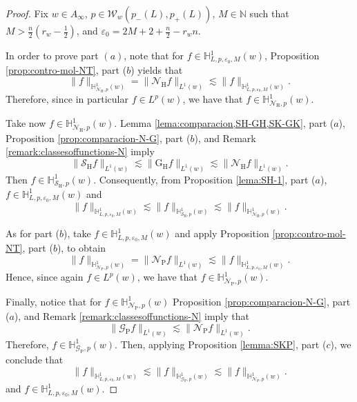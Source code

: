 \documentclass[11pt, a4paper,leqno]{amsart}
\theoremstyle{plain}
\theoremstyle{definition}
\theoremstyle{remark}
\numberwithin{equation}{section}
\def \N{ \mathbb{N} }
\def \Scal{ \mathcal{S} }
\def \hh{ \mathrm{H} }
\def \pp{ \mathrm{P} }
\def \Gcal { \mathcal{G} }
\def \Grm{ \mathrm{G} }
\def \Ncal { \mathcal{N} }
\begin{document}
\begin{proof}
Fix $w\in A_{\infty}$, $p\in \mathcal{W}_w(p_-(L),p_+(L))$, $M\in \N$ such that $M>\frac{n}{2}\left(r_w-\frac{1}{2}\right)$, and $\varepsilon_0=2M+2+\frac{n}{2}-r_wn$. 



In order to prove part $(a)$, note that 
for $f\in \mathbb{H}^1_{L,p,\varepsilon_0, M}(w)$, Proposition \ref{prop:contro-mol-NT}, part ($b$) yields that
$$
\|f\|_{\mathbb{H}^1_{\Ncal_{\hh},p}(w)}=\|\Ncal_{\hh}f\|_{L^1(w)}\lesssim\|f\|_{\mathbb{H}^1_{L,p,\varepsilon_0, M}(w)}.
$$ 
Therefore, since in particular $f\in L^p(w)$, we have that $f\in \mathbb{H}^1_{\Ncal_{\hh},p}(w)$.

\medskip

Take now  $f\in \mathbb{H}^1_{\Ncal_{\hh},p}(w)$. Lemma \ref{lema:comparacion,SH-GH,SK-GK}, part ($a$), Proposition \ref{prop:comparacion-N-G}, part ($b$), and Remark \ref{remark:classesoffunctions-N} imply
$$
\|\Scal_{\hh}f\|_{L^1(w)}\lesssim\|\Grm_{\hh}f\|_{L^1(w)}\lesssim \|\Ncal_{\hh}f\|_{L^1(w)}.
$$ 
Then $f\in \mathbb{H}^1_{\Scal_{\hh},p}(w)$. Consequently, from Proposition \ref{lema:SH-1}, part ($a$), $f\in \mathbb{H}^1_{L,p,\varepsilon_0,M}(w)$ and 
$$
\|f\|_{\mathbb{H}^1_{L,p,\varepsilon_0, M}(w)}\lesssim \|f\|_{\mathbb{H}^1_{\Scal_{\hh},p}(w)}\lesssim \|f\|_{\mathbb{H}^1_{\Ncal_{\hh},p}(w)}.
$$

\medskip 

As for part ($b$), take $f\in \mathbb{H}^1_{L,p,\varepsilon_0,M}(w)$ and apply Proposition \ref{prop:contro-mol-NT}, part ($b$), to obtain
$$
\|f\|_{\mathbb{H}^1_{\Ncal_{\pp},p}(w)}=\|\Ncal_{\pp}f\|_{L^1(w)}\lesssim\|f\|_{\mathbb{H}^1_{L,p,\varepsilon_0,M}(w)}.
$$
Hence, since again $f\in L^p(w)$, we have that
$f\in \mathbb{H}_{\Ncal_{\pp},p}^1(w).$

Finally, notice that for $f\in \mathbb{H}^1_{\Ncal_{\pp},p}(w)$  Proposition \ref{prop:comparacion-N-G}, part ($a$), and Remark \ref{remark:classesoffunctions-N} imply that 
$$
\|\Gcal_{\pp}f\|_{L^1(w)}\lesssim\|\Ncal_{\pp}f\|_{L^1(w)}.
$$
Therefore,  $f\in \mathbb{H}^1_{\Gcal_{\pp},p}(w)$.
Then, applying Proposition \ref{lemma:SKP}, part ($c$), we conclude that
$$
\|f\|_{\mathbb{H}^1_{L,p,\varepsilon_0, M}(w)}\lesssim \|f\|_{\mathbb{H}^1_{\Gcal_{\pp},p}(w)}\lesssim\|f\|_{\mathbb{H}^1_{\Ncal_{\pp},p}(w)}.
$$
and  $f\in \mathbb{H}^1_{L,p,\varepsilon_0, M}(w)$.
\end{proof}

\bigskip
\end{document}
